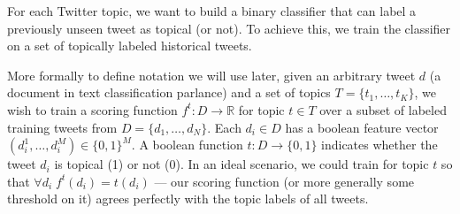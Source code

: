 


For each Twitter topic, we want to build a binary classifier that can label
a previously unseen tweet as topical (or not).  To achieve this, we 
train the classifier on a set of topically labeled historical tweets.  

More formally to define notation we will use later, 
given an arbitrary tweet $d$ (a document in text classification parlance) 
and a set of topics $T = \{
t_1,\ldots,t_K\}$, we wish to train a scoring function $f^t: D \rightarrow \mathbb{R}$
for topic $t \in T$ over a subset of labeled training tweets from $D = \{
d_1,\ldots,d_N \}$.  Each $d_i \in D$ has a boolean feature vector 
$(d_i^1,\ldots,d_i^M) \in \{0,1\}^M$.  A boolean function $t : D \rightarrow \{
0,1 \}$ indicates whether the tweet $d_i$ is topical (1) or not
(0).  In an ideal scenario, we could train for topic $t$ 
so that $\forall d_i \; f^t(d_i) = t(d_i)$ --- our scoring
function (or more generally some threshold on it) agrees perfectly with the topic
labels of all tweets.  



